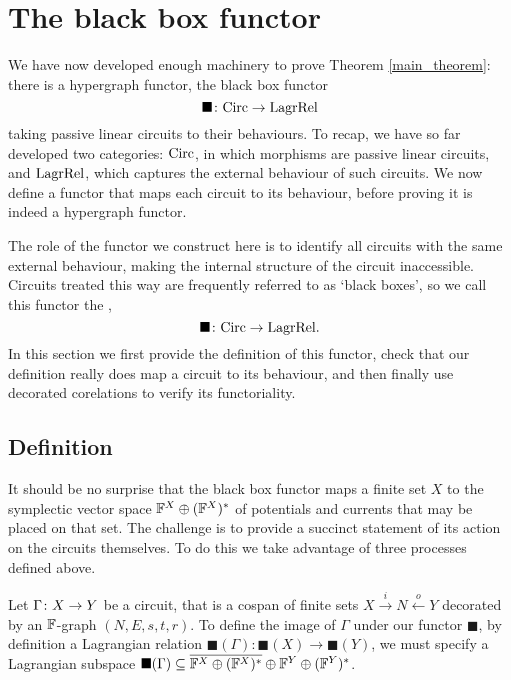 \section{The black box functor} \label{sec:blackbox}
We have now developed enough machinery to prove Theorem \ref{main_theorem}:
there is a hypergraph functor, the black box functor
\[  
\blacksquare{\colon} \mathrm{Circ} \to \mathrm{LagrRel} 
\]
taking passive linear circuits to their behaviours. To recap, we have so far
developed two categories: $\mathrm{Circ}$, in which morphisms are passive linear
circuits, and $\mathrm{LagrRel}$, which captures the external behaviour of such circuits.
We now define a functor that maps each circuit to its behaviour, before proving
it is indeed a hypergraph functor. 

The role of the functor we construct here is to identify all circuits with the
same external behaviour, making the internal structure of the circuit
inaccessible. Circuits treated this way are frequently referred to as
`black boxes', so we call this functor the ,
\[
\blacksquare{\colon} \mathrm{Circ} \to \mathrm{LagrRel}.
\] 
In this section we first provide the definition of this functor, check
that our definition really does map a circuit to its behaviour, and then finally
use decorated corelations to verify its functoriality.

\subsection{Definition}
It should be no surprise that the black box functor maps a finite set $X$ to the
symplectic vector space ${\mathbb F}^X \oplus ({\mathbb F}^X)^\ast$ of potentials and currents
that may be placed on that set. The challenge is to provide a succinct
statement of its action on the circuits themselves. To do this we take advantage
of three processes defined above.

Let $\Gamma{\colon} X \to Y$ be a circuit, that is a cospan of finite sets $X
\stackrel{i}{\longrightarrow} N \stackrel{o}{\longleftarrow} Y$ decorated by an
${\mathbb F}$-graph $(N,E,s,t,r)$. To define the image of $\Gamma$ under our functor
$\blacksquare$, by definition a Lagrangian relation $\blacksquare(\Gamma):
\blacksquare(X) \to \blacksquare(Y)$, we must specify a Lagrangian subspace
$\blacksquare(\Gamma) \subseteq \overline{{\mathbb F}^X \oplus ({\mathbb F}^X)^\ast} \oplus {\mathbb F}^Y
\oplus ({\mathbb F}^Y)^\ast$.  

